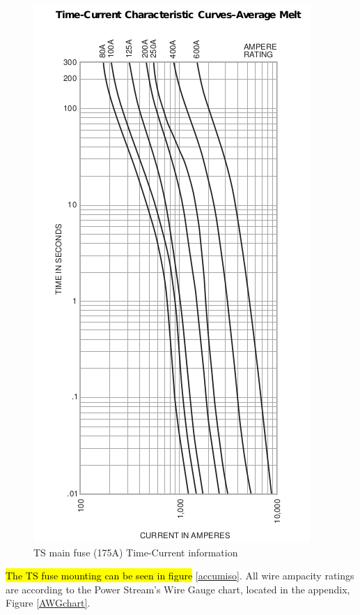 \documentclass{article}
\DeclareRobustCommand{\hlr}[1]{{\sethlcolor{red}\hl{#1}}}
\begin{document}
            \begin{figure}[H]
                \centering
                \includegraphics[width = 0.25 \textheight]{TSfuseT-Agraph}
                \caption{TS main fuse (175A) Time-Current information}
                \label{TSi2t}
            \end{figure}

            \hlr{The TS fuse mounting can be seen in figure} \ref{accumiso}.
            All wire ampacity ratings are according to the Power Stream's Wire Gauge chart, located in the appendix, Figure \ref{AWGchart}.
\end{document}
